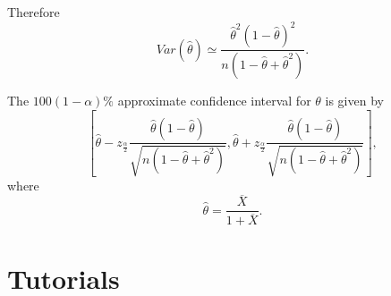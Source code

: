 \begin{solution}
    Therefore
    \[
        Var\left(\widehat{\theta}\right) \simeq \frac{\widehat{\theta}^2\left(1 - \widehat{\theta}\right)^2}{n\left(1 - \widehat{\theta} + \widehat{\theta}^2\right)}.
    \]

    The $100(1-\alpha)\%$ approximate confidence interval for $\theta$ is given by
    \[
        \left[\widehat{\theta} - z_{\frac{\alpha}{2}} \frac{\widehat{\theta}\left(1 - \widehat{\theta}\right)}{\sqrt{n\left(1 - \widehat{\theta} + \widehat{\theta}^2\right)}}, \widehat{\theta} + z_{\frac{\alpha}{2}} \frac{\widehat{\theta}\left(1 - \widehat{\theta}\right)}{\sqrt{n\left(1 - \widehat{\theta} + \widehat{\theta}^2\right)}}\right],
    \]
    where 
    \[
        \widehat{\theta} = \frac{\overline{X}}{1 + \overline{X}}.
    \]
\end{solution}

\section*{Tutorials}

